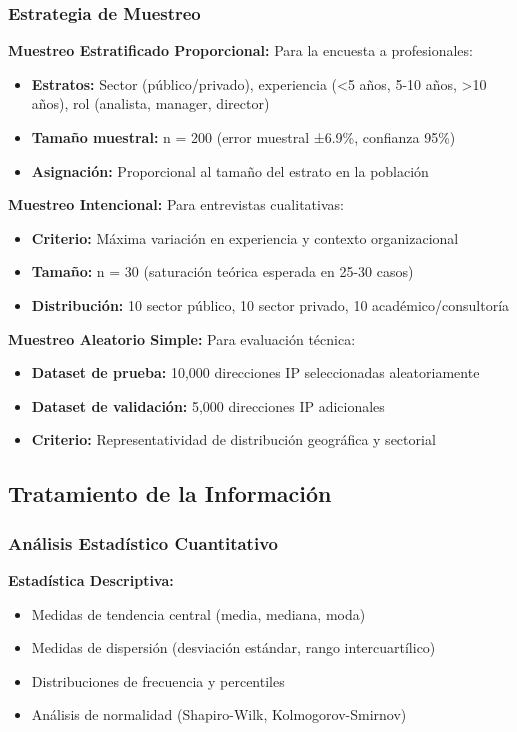\subsubsection{Estrategia de Muestreo}

\textbf{Muestreo Estratificado Proporcional:}
Para la encuesta a profesionales:
\begin{itemize}
    \item \textbf{Estratos:} Sector (público/privado), experiencia (<5 años, 5-10 años, >10 años), rol (analista, manager, director)
    \item \textbf{Tamaño muestral:} n = 200 (error muestral ±6.9\%, confianza 95\%)
    \item \textbf{Asignación:} Proporcional al tamaño del estrato en la población
\end{itemize}

\textbf{Muestreo Intencional:}
Para entrevistas cualitativas:
\begin{itemize}
    \item \textbf{Criterio:} Máxima variación en experiencia y contexto organizacional
    \item \textbf{Tamaño:} n = 30 (saturación teórica esperada en 25-30 casos)
    \item \textbf{Distribución:} 10 sector público, 10 sector privado, 10 académico/consultoría
\end{itemize}

\textbf{Muestreo Aleatorio Simple:}
Para evaluación técnica:
\begin{itemize}
    \item \textbf{Dataset de prueba:} 10,000 direcciones IP seleccionadas aleatoriamente
    \item \textbf{Dataset de validación:} 5,000 direcciones IP adicionales
    \item \textbf{Criterio:} Representatividad de distribución geográfica y sectorial
\end{itemize}

\subsection{Tratamiento de la Información}

\subsubsection{Análisis Estadístico Cuantitativo}

\textbf{Estadística Descriptiva:}
\begin{itemize}
    \item Medidas de tendencia central (media, mediana, moda)
    \item Medidas de dispersión (desviación estándar, rango intercuartílico)
    \item Distribuciones de frecuencia y percentiles
    \item Análisis de normalidad (Shapiro-Wilk, Kolmogorov-Smirnov)
\end{itemize}

